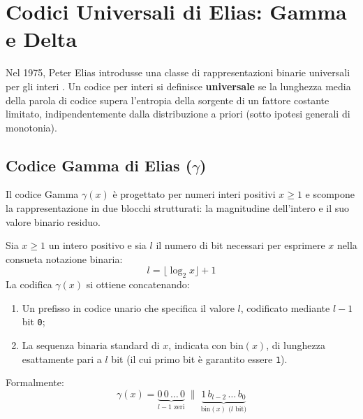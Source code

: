 \FloatBarrier
\section{Codici Universali di Elias: Gamma e Delta}
\label{sec:codici-elias}

Nel 1975, Peter Elias introdusse una classe di rappresentazioni binarie universali per gli interi \cite{elias1975}. Un codice per interi si definisce \textbf{universale} se la lunghezza media della parola di codice supera l'entropia della sorgente di un fattore costante limitato, indipendentemente dalla distribuzione a priori (sotto ipotesi generali di monotonia).

\FloatBarrier
\subsection{Codice Gamma di Elias ($\gamma$)}
\label{subsec:elias-gamma}

Il codice Gamma $\gamma(x)$ \`e progettato per numeri interi positivi $x \ge 1$ e scompone la rappresentazione in due blocchi strutturati: la magnitudine dell'intero e il suo valore binario residuo.

\begin{definition}
Sia $x \ge 1$ un intero positivo e sia $l$ il numero di bit necessari per esprimere $x$ nella consueta notazione binaria:
\begin{equation}
  l = \lfloor \log_2 x \rfloor + 1
\end{equation}
La codifica $\gamma(x)$ si ottiene concatenando:
\begin{enumerate}
  \item Un prefisso in codice unario che specifica il valore $l$, codificato mediante $l - 1$ bit \texttt{0};
  \item La sequenza binaria standard di $x$, indicata con $\text{bin}(x)$, di lunghezza esattamente pari a $l$ bit (il cui primo bit \`e garantito essere \texttt{1}).
\end{enumerate}
Formalmente:
\begin{equation}
  \gamma(x) = \underbrace{0 \, 0 \, \dots \, 0}_{l-1 \text{ zeri}} \;\|\; \underbrace{1 \, b_{l-2} \, \dots \, b_0}_{\text{bin}(x) \text{ ($l$ bit)}}
\end{equation}
\end{definition}

